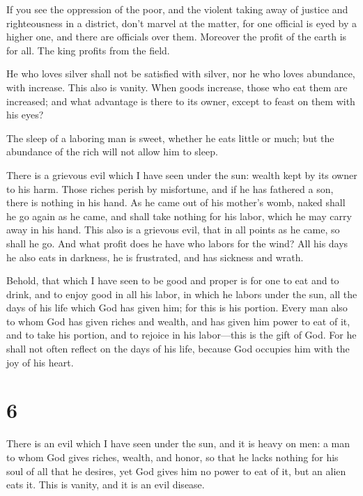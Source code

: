  If you see the oppression of the poor, and the violent
taking away of justice and righteousness in a district, don't marvel at
the matter, for one official is eyed by a higher one, and there are
officials over them.  Moreover the profit of the earth is
for all. The king profits from the field.

 He who loves silver shall not be satisfied with silver,
nor he who loves abundance, with increase. This also is vanity.
 When goods increase, those who eat them are increased;
and what advantage is there to its owner, except to feast on them with
his eyes?

 The sleep of a laboring man is sweet, whether he eats
little or much; but the abundance of the rich will not allow him to
sleep.

 There is a grievous evil which I have seen under the
sun: wealth kept by its owner to his harm.  Those riches
perish by misfortune, and if he has fathered a son, there is nothing in
his hand.  As he came out of his mother's womb, naked
shall he go again as he came, and shall take nothing for his labor,
which he may carry away in his hand.  This also is a
grievous evil, that in all points as he came, so shall he go. And what
profit does he have who labors for the wind?  All his
days he also eats in darkness, he is frustrated, and has sickness and
wrath.

 Behold, that which I have seen to be good and proper is
for one to eat and to drink, and to enjoy good in all his labor, in
which he labors under the sun, all the days of his life which God has
given him; for this is his portion.  Every man also to
whom God has given riches and wealth, and has given him power to eat of
it, and to take his portion, and to rejoice in his labor---this is the
gift of God.  For he shall not often reflect on the days
of his life, because God occupies him with the joy of his heart.

\hypertarget{section-5}{%
\section{6}\label{section-5}}

 There is an evil which I have seen under the sun, and it
is heavy on men:  a man to whom God gives riches, wealth,
and honor, so that he lacks nothing for his soul of all that he desires,
yet God gives him no power to eat of it, but an alien eats it. This is
vanity, and it is an evil disease.

